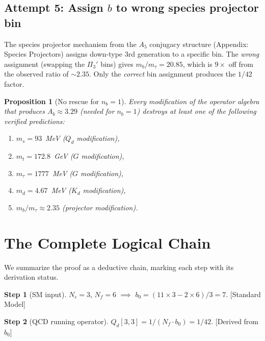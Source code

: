 \documentclass[11pt,a4paper]{article}
\newtheorem{proposition}[theorem]{Proposition}
\theoremstyle{definition}
\theoremstyle{remark}
\begin{document}
\subsection{Attempt 5: Assign $b$ to wrong species projector bin}

The species projector mechanism from the $A_5$ conjugacy structure
(Appendix: Species Projectors) assigns down-type 3rd generation to a
specific bin.  The \emph{wrong} assignment (swapping the $\Pi_3'$ bins)
gives $m_b/m_\tau = 20.85$, which is $9\times$ off from the observed ratio
of $\sim 2.35$.  Only the \emph{correct} bin assignment produces the
$1/42$ factor.

\begin{proposition}[No rescue for $n_b = 1$]
\label{prop:no_rescue}
Every modification of the operator algebra that produces $A_b \approx 3.29$
(needed for $n_b = 1$) destroys at least one of the following verified predictions:
\begin{enumerate}
\item $m_s = 93$~MeV ($Q_d$ modification),
\item $m_t = 172.8$~GeV ($G$ modification),
\item $m_\tau = 1777$~MeV ($G$ modification),
\item $m_d = 4.67$~MeV ($K_d$ modification),
\item $m_b/m_\tau \approx 2.35$ (projector modification).
\end{enumerate}
\end{proposition}

\section{The Complete Logical Chain}
\label{sec:chain}

We summarize the proof as a deductive chain, marking each step with its
derivation status.

\medskip

\noindent
\textbf{Step 1} (SM input).
$N_c = 3$, $N_f = 6$ $\implies$ $b_0 = (11 \times 3 - 2 \times 6)/3 = 7$.
\hfill {\color{proven}[Standard Model]}

\medskip

\noindent
\textbf{Step 2} (QCD running operator).
$Q_d[3,3] = 1/(N_f \cdot b_0) = 1/42$.
\hfill {\color{proven}[Derived from $b_0$]}

\medskip
\end{document}
